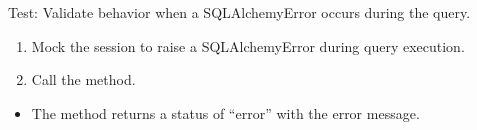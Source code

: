 \documentclass[letterpaper,10pt,english]{sphinxmanual}
\begin{document}
\begin{fulllineitems}
\label{\detokenize{test:test.test_room.test_list_rooms_sqlalchemy_error}}
\pysigstartsignatures
\pysiglinewithargsret
{}
{\sphinxparamcomma {}}
{}
\pysigstopsignatures
\sphinxAtStartPar
Test: Validate behavior when a SQLAlchemyError occurs during the query.
\begin{description}
\begin{enumerate}
%
\item {} 
\sphinxAtStartPar
Mock the session to raise a SQLAlchemyError during query execution.

\item {} 
\sphinxAtStartPar
Call the  method.

\end{enumerate}

\begin{itemize}
\item {} 
\sphinxAtStartPar
The method returns a status of “error” with the error message.

\end{itemize}

\end{description}

\end{fulllineitems}

\end{document}

